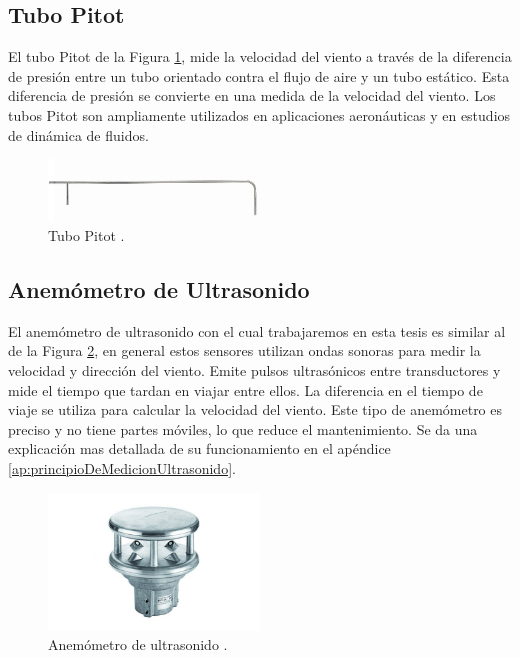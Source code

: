 \subsection*{Tubo Pitot}

El tubo Pitot  de la Figura \ref{fig:tuboPitot}, mide la velocidad del viento a través de la diferencia de presión entre un tubo orientado contra el flujo de aire y un tubo estático. Esta diferencia de presión se convierte en una medida de la velocidad del viento. Los tubos Pitot son ampliamente utilizados en aplicaciones aeronáuticas y en estudios de dinámica de fluidos.

\begin{figure}[h]
    \centering
    \includegraphics[width=0.5\textwidth]{Figuras/viento/sensores/tuboPitot.jpg}
    \caption{Tubo Pitot \cite{testoAnemometer}.}
    \label{fig:tuboPitot}
\end{figure}

\subsection*{Anemómetro de Ultrasonido}

El anemómetro de ultrasonido con el cual trabajaremos en esta tesis es similar al de la Figura \ref{fig:ultrasonido}, en general estos sensores utilizan ondas sonoras para medir la velocidad y dirección del viento. Emite pulsos ultrasónicos entre transductores y mide el tiempo que tardan en viajar entre ellos. La diferencia en el tiempo de viaje se utiliza para calcular la velocidad del viento. Este tipo de anemómetro es preciso y no tiene partes móviles, lo que reduce el mantenimiento. Se da una explicación mas detallada de su funcionamiento en el apéndice \ref{ap:principioDeMedicionUltrasonido}.

\begin{figure}[h]
    \centering
    \includegraphics[width=0.5\textwidth]{Figuras/viento/sensores/ultrasonido.png}
    \caption{Anemómetro de ultrasonido \cite{ventusumb2024}.}
    \label{fig:ultrasonido}
\end{figure}

